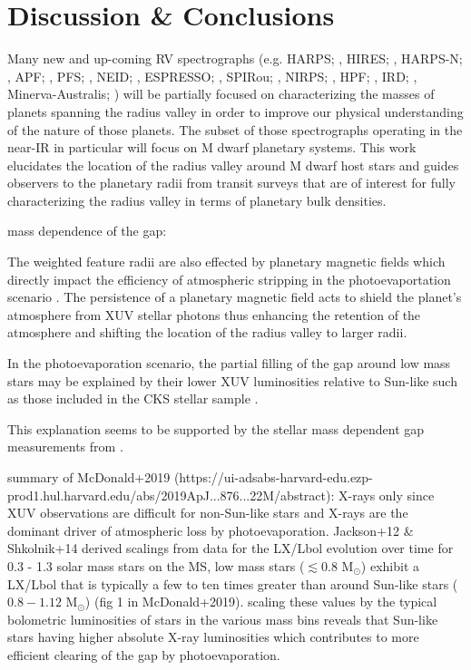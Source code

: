 \documentclass[modern]{aastex63}
\begin{document}
\section{Discussion \& Conclusions} \label{sect:conclusion}
Many new and up-coming RV spectrographs (e.g. HARPS; \citealt{mayor03}, HIRES; \citealt{}, 
HARPS-N; \citealt{}, APF; \citealt{}, PFS; \citealt{}, NEID; \citealt{},
ESPRESSO; \citealt{}, SPIRou; \citealt{}, NIRPS; \citealt{},  HPF; \citealt{}, IRD; \citealt{},
Minerva-Australis; \citealt{})
will be partially focused on characterizing the masses of planets spanning the radius valley in order to
improve our physical understanding of the nature of those planets. The subset of those spectrographs operating
in the near-IR in particular will focus on M dwarf planetary systems. This work elucidates the location of
the radius valley around M dwarf host stars and guides observers to the planetary radii from transit surveys
that are of interest for fully characterizing the radius valley in terms of planetary bulk densities.

mass dependence of the gap: 

The weighted feature radii are also effected by planetary magnetic fields which directly impact the 
efficiency of atmospheric stripping in the photoevaportation scenario \citep{owen19}. The persistence 
of a planetary magnetic field acts to shield the planet's atmosphere from XUV stellar photons thus 
enhancing the retention of the atmosphere and shifting the location of the radius valley to larger 
radii.

In the photoevaporation scenario, the
partial filling of the gap around low mass stars may be explained by their lower XUV luminosities relative to 
Sun-like such as those included in the CKS stellar sample \citep{}.

This explanation seems to be supported by the stellar mass dependent gap measurements from \cite{fulton18}. 

summary of McDonald+2019 (https://ui-adsabs-harvard-edu.ezp-prod1.hul.harvard.edu/abs/2019ApJ...876...22M/abstract):
X-rays only since XUV observations are difficult for non-Sun-like stars and X-rays are the dominant driver of 
atmospheric loss by photoevaporation. 
Jackson+12 \& Shkolnik+14 derived scalings from data for the LX/Lbol evolution over time for 0.3 - 1.3 solar mass stars
on the MS, low mass stars ($\lesssim 0.8$ M$_{\odot}$) exhibit a LX/Lbol that is typically a few to ten times greater 
than around Sun-like stars ($0.8-1.12$ M$_{\odot}$) (fig 1 in McDonald+2019).
scaling these values by the typical bolometric luminosities of stars in the various mass bins reveals that 
Sun-like stars having higher absolute X-ray luminosities which contributes to more efficient clearing of the 
gap by photoevaporation.
\end{document}
